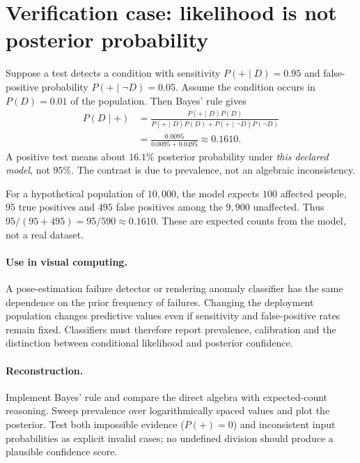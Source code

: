 \clearpage
\section*{Verification case: likelihood is not posterior probability}
\noindent Suppose a test detects a condition with sensitivity
\(P(+\mid D)=0.95\) and false-positive probability
\(P(+\mid\neg D)=0.05\). Assume the condition occurs in
\(P(D)=0.01\) of the population. Then Bayes' rule gives
\[
\begin{aligned}
P(D\mid+)
&=\frac{P(+\mid D)P(D)}
{P(+\mid D)P(D)+P(+\mid\neg D)P(\neg D)}\\
&=\frac{0.0095}{0.0095+0.0495}
\approx0.1610.
\end{aligned}
\]
A positive test means about \(16.1\%\) posterior probability
under \emph{this declared model}, not \(95\%\).
The contrast is due to prevalence, not an algebraic inconsistency.

For a hypothetical population of \(10{,}000\), the model expects
\(100\) affected people, \(95\) true positives and \(495\)
false positives among the \(9{,}900\) unaffected.
Thus \(95/(95+495)=95/590\approx0.1610\).
These are expected counts from the model, not a real dataset.

\paragraph{Use in visual computing.}
A pose-estimation failure detector or rendering anomaly classifier
has the same dependence on the prior frequency of failures.
Changing the deployment population changes predictive values
even if sensitivity and false-positive rates remain fixed.
Classifiers must therefore report prevalence, calibration and
the distinction between conditional likelihood and posterior
confidence.

\paragraph{Reconstruction.}
Implement Bayes' rule and compare the direct algebra with
expected-count reasoning. Sweep prevalence over logarithmically
spaced values and plot the posterior. Test both impossible
evidence (\(P(+)=0\)) and inconsistent input probabilities as
explicit invalid cases; no undefined division should produce a
plausible confidence score.
